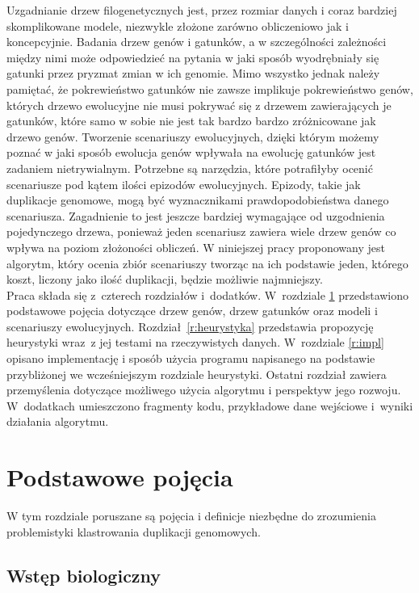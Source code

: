 \documentclass[licencjacka]{pracamgr}
\begin{document}
Uzgadnianie drzew filogenetycznych jest, przez rozmiar danych i coraz bardziej skomplikowane modele, niezwykle złożone zarówno obliczeniowo jak i koncepcyjnie. Badania drzew genów i gatunków, a w szczególności zależności między nimi może odpowiedzieć na pytania w jaki sposób wyodrębniały się gatunki przez pryzmat zmian w ich genomie. Mimo wszystko jednak należy pamiętać, że pokrewieństwo gatunków nie zawsze implikuje pokrewieństwo genów, których drzewo ewolucyjne nie musi pokrywać się z drzewem zawierających je gatunków, które samo w sobie nie jest tak bardzo bardzo zróżnicowane jak drzewo genów. Tworzenie scenariuszy ewolucyjnych, dzięki którym możemy poznać w jaki sposób ewolucja genów wpływała na ewolucję gatunków jest zadaniem nietrywialnym. Potrzebne są narzędzia, które potrafiłyby ocenić scenariusze pod kątem ilości epizodów ewolucyjnych. Epizody, takie jak duplikacje genomowe, mogą być wyznacznikami prawdopodobieństwa danego scenariusza. Zagadnienie to jest jeszcze bardziej wymagające od uzgodnienia pojedynczego drzewa, ponieważ jeden scenariusz zawiera wiele drzew genów co wpływa na poziom złożoności obliczeń. W niniejszej pracy proponowany jest algorytm, który ocenia zbiór scenariuszy tworząc na ich podstawie jeden, którego koszt, liczony jako ilość duplikacji, będzie możliwie najmniejszy.
\\
Praca składa się z~czterech rozdziałów i~dodatków.
W~rozdziale \ref{r:pojecia} przedstawiono podstawowe pojęcia dotyczące drzew genów, drzew gatunków oraz modeli i scenariuszy ewolucyjnych.  
Rozdział~\ref{r:heurystyka} przedstawia propozycję heurystyki wraz~z jej testami na rzeczywistych danych.  W~rozdziale \ref{r:impl} opisano implementację i sposób użycia programu napisanego na podstawie przybliżonej we wcześniejszym rozdziale heurystyki.
Ostatni rozdział zawiera przemyślenia dotyczące możliwego użycia algorytmu i perspektyw jego rozwoju. W~dodatkach umieszczono fragmenty kodu, przykładowe dane wejściowe i~wyniki działania algorytmu.

\chapter{Podstawowe pojęcia}\label{r:pojecia}

W tym rozdziale poruszane są pojęcia i definicje niezbędne do zrozumienia problemistyki klastrowania duplikacji genomowych. 
\section{Wstęp biologiczny}
\end{document}
